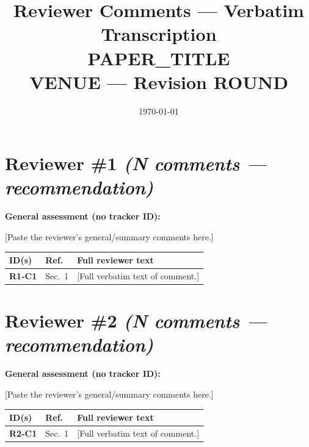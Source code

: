 \documentclass[11pt,landscape]{article}
\title{Reviewer Comments — Verbatim Transcription\\[4pt]
  \large {{PAPER_TITLE}}\\[2pt]
  \normalsize {{VENUE}} — Revision {{ROUND}}}
\author{}
\date{\today}
\newcommand{\cid}[1]{\textbf{\textcolor{idcol}{#1}}}
\begin{document}
\maketitle
\thispagestyle{empty}

\section{Reviewer \#1 \normalfont\textit{(N comments --- recommendation)}}

\begin{genbox}
\textbf{General assessment (no tracker ID):}

[Paste the reviewer's general/summary comments here.]
\end{genbox}

\vspace{0.5em}

\begin{tabularx}{\textwidth}{@{} L{1.8cm} l Y @{}}
\toprule
\textbf{ID(s)} & \textbf{Ref.} & \textbf{Full reviewer text} \\
\midrule
\cid{R1-C1}
  & Sec.~1
  & [Full verbatim text of comment.]
\\
\bottomrule
\end{tabularx}

\section{Reviewer \#2 \normalfont\textit{(N comments --- recommendation)}}

\begin{genbox}
\textbf{General assessment (no tracker ID):}

[Paste the reviewer's general/summary comments here.]
\end{genbox}

\vspace{0.5em}

\begin{tabularx}{\textwidth}{@{} L{1.8cm} l Y @{}}
\toprule
\textbf{ID(s)} & \textbf{Ref.} & \textbf{Full reviewer text} \\
\midrule
\cid{R2-C1}
  & Sec.~1
  & [Full verbatim text of comment.]
\\
\bottomrule
\end{tabularx}
\end{document}
